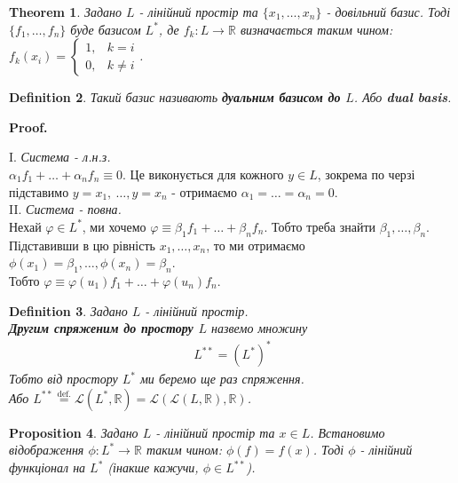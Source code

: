 \documentclass[a4paper, 10pt]{article}
\makeatletter
\theoremstyle{theoremdd}
\newtheorem{theorem}{Theorem}[subsection]
\newtheorem{definition}[theorem]{Definition}
\newtheorem{proposition}[theorem]{Proposition}
\renewenvironment{proof}[1][Proof.\\]{\par
\pushQED{\hfill \qed}%
\normalfont \topsep6\p@\@plus6\p@\relax
\trivlist
\item\relax
{\bfseries
#1\@addpunct{.}}\hspace\labelsep\ignorespaces
}{%
\popQED\endtrivlist\@endpefalse
}
\makeatother
\begin{document}
\begin{theorem}
Задано $L$ - лінійний простір та $\{x_1,\dots,x_n\}$ - довільний базис. Тоді $\{f_1,\dots,f_n\}$ буде базисом $L^*$, де $f_k \colon L \to \mathbb{R}$ визначається таким чином: $f_k(x_i) = \begin{cases} 1, & k = i \\ 0, & k \neq i \end{cases}$.
\end{theorem}

\begin{definition}
Такий базис називають \textbf{дуальним базисом до $L$}. Або \textbf{dual basis}.
\end{definition}

\begin{proof}
I. \textit{Система - л.н.з.}\\
$\alpha_1 f_1 + \dots + \alpha_n f_n \equiv 0$. Це виконується для кожного $y \in L$, зокрема по черзі підставимо $y = x_1,\ \dots, y = x_n$ - отримаємо $\alpha_1 = \dots = \alpha_n = 0$.
\bigskip \\
II. \textit{Система - повна.}\\
Нехай $\varphi \in L^*$, ми хочемо $\varphi \equiv \beta_1 f_1 + \dots + \beta_n f_n$. Тобто треба знайти $\beta_1, \dots, \beta_n$.\\
Підставивши в цю рівність $x_1,\dots,x_n$, то ми отримаємо $\phi(x_1) = \beta_1, \dots, \phi(x_n) = \beta_n$.\\
Тобто $\varphi \equiv \varphi(u_1) f_1 + \dots + \varphi(u_n) f_n$.
\end{proof}

\begin{definition}
Задано $L$ - лінійний простір.\\
\textbf{Другим спряженим до простору $L$} назвемо множину
\begin{align*}
L^{**} = (L^*)^*
\end{align*}
Тобто від простору $L^*$ ми беремо ще раз спряження.\\
Або $L^{**} \overset{\text{def.}}{=} \mathcal{L}(L^*,\mathbb{R}) = \mathcal{L}(\mathcal{L}(L,\mathbb{R}),\mathbb{R})$.
\end{definition}

\begin{proposition}
Задано $L$ - лінійний простір та $x \in L$. Встановимо відображення $\phi \colon L^* \to \mathbb{R}$ таким чином: $\phi(f) = f(x)$. Тоді $\phi$ - лінійний функціонал на $L^*$ (інакше кажучи, $\phi \in L^{**}$).
\end{proposition}
\end{document}
